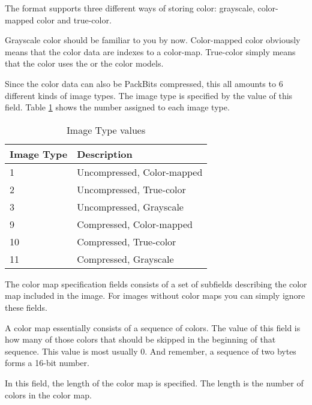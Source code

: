 
The \tga format supports three different ways of storing color:
grayscale, color-mapped color and
true-color.

Grayscale color should be familiar to you by now. Color-mapped color
obviously means that the color data are indexes to a
color-map. True-color simply means that the color uses the \rgb or the
\rgba color models.

Since the color data can also be PackBits \rle compressed, this all
amounts to $6$ different kinds of image types. The image type is
specified by the value of this field. Table \ref{tab:imgtype} shows
the number assigned to each image type.

\begin{table}
  \centering
  \begin{tabular}{ll}
    \toprule
    Image Type & Description \\
    \midrule
    1 & Uncompressed, Color-mapped \\
    2 & Uncompressed, True-color \\
    3 & Uncompressed, Grayscale\\
    9 & Compressed, Color-mapped \\
    10 & Compressed, True-color \\
    11 & Compressed, Grayscale\\
    \bottomrule
  \end{tabular}
  \caption{\tga Image Type values}
  \label{tab:imgtype}
\end{table}


The color map specification fields consists of a set of subfields
describing the color map included in the image. For images without
color maps you can simply ignore these fields.


A color map essentially consists of a sequence of colors. The value of
this field is how many of those colors that should be skipped in the
beginning of that sequence. This value is most usually $0$. And
remember, a sequence of two bytes forms a 16-bit number.


In this field, the length of the color map is specified. The
length is the number of colors in the color map.


